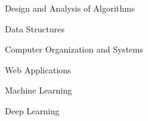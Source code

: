 
  \begin{cventries}
    \vspace{-36pt}
    \cventry
      {}
      {}
      {}
      {}
      {
        \begin{multicols}{3}
        \begin{cvitems}
          \item{Design and Analysis of Algorithms}
          \item{Data Structures}
          \item{Computer Organization and Systems}
          \item{Web Applications}
          \item{Machine Learning}
          \item{Deep Learning}
        \end{cvitems}
        \end{multicols}
      }
  \end{cventries}
  \vspace{-20pt}